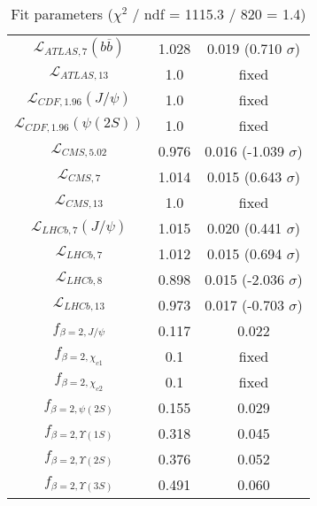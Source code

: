 \begin{table}[h!]
\begin{tabular}{c|c|c}
$\mathcal L_{ATLAS,7}(b\overline b)$ & 1.028 & 0.019 (0.710 $\sigma$) \\
$\mathcal L_{ATLAS,13}$ & 1.0 & fixed \\
$\mathcal L_{CDF,1.96}(J/\psi)$ & 1.0 & fixed \\
$\mathcal L_{CDF,1.96}(\psi(2S))$ & 1.0 & fixed \\
$\mathcal L_{CMS,5.02}$ & 0.976 & 0.016 (-1.039 $\sigma$) \\
$\mathcal L_{CMS,7}$ & 1.014 & 0.015 (0.643 $\sigma$) \\
$\mathcal L_{CMS,13}$ & 1.0 & fixed \\
$\mathcal L_{LHCb,7}(J/\psi)$ & 1.015 & 0.020 (0.441 $\sigma$) \\
$\mathcal L_{LHCb,7}$ & 1.012 & 0.015 (0.694 $\sigma$) \\
$\mathcal L_{LHCb,8}$ & 0.898 & 0.015 (-2.036 $\sigma$) \\
$\mathcal L_{LHCb,13}$ & 0.973 & 0.017 (-0.703 $\sigma$) \\
$f_{\beta=2,J/\psi}$ & 0.117 & 0.022 \\
$f_{\beta=2,\chi_{c1}}$ & 0.1 & fixed \\
$f_{\beta=2,\chi_{c2}}$ & 0.1 & fixed \\
$f_{\beta=2,\psi(2S)}$ & 0.155 & 0.029 \\
$f_{\beta=2,\Upsilon(1S)}$ & 0.318 & 0.045 \\
$f_{\beta=2,\Upsilon(2S)}$ & 0.376 & 0.052 \\
$f_{\beta=2,\Upsilon(3S)}$ & 0.491 & 0.060 \\
\end{tabular}
\caption{Fit parameters ($\chi^2$ / ndf = 1115.3 / 820 = 1.4)}
\end{table}
